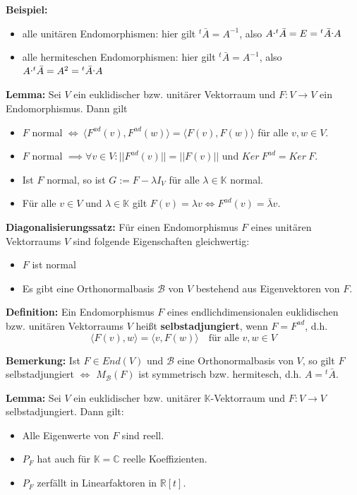 \documentclass{article}
\let\oldcdot\cdot
\renewcommand{\cdot}{\raisebox{0.1ex}{$\oldcdot$}}
\begin{document}
\textbf{Beispiel:}
\begin{itemize}
\item alle unitären Endomorphismen: hier gilt ${^t\bar A=A^{-1}}$, also
	$A\cdot{^t\bar A}= E = {^t\bar A}\cdot A$
\item alle hermiteschen Endomorphismen: hier gilt ${^t\bar A=A^{-1}}$, also
	$A\cdot{^t\bar A}= A^2 = {^t\bar A}\cdot A$
\end{itemize}

\textbf{Lemma:} Sei $V$ ein euklidischer bzw. unitärer Vektorraum und $F:V\to
V$ ein Endomorphismus. Dann gilt
\begin{itemize}
\item[1)] $F$ normal $\iff\ \langle F^{ad}(v),F^{ad}(w)\rangle=\langle
	F(v),F(w)\rangle$ für alle $v,w\in V$.
\item[2)] $F$ normal $\implies\forall v\in V:||F^{ad}(v)||=||F(v)||$ und $Ker\
	F^{ad}=Ker\ F$.
\item[3)] Ist $F$ normal, so ist $G:=F-\lambda I_V$ für alle
	$\lambda\in\mathbb{K}$ normal.
\item[4)] Für alle $v\in V$ und $\lambda\in\mathbb{K}$ gilt $F(v)=\lambda v\iff
	F^{ad}(v)=\bar\lambda v$.
\end{itemize}

\newpage
\textbf{Diagonalisierungssatz:} Für einen Endomorphismus $F$ eines unitären
Vektorraums $V$ sind folgende Eigenschaften gleichwertig:
\begin{itemize}
\item[i)] $F$ ist normal
\item[ii)] Es gibt eine Orthonormalbasis $\mathcal{B}$ von $V$ bestehend aus
	Eigenvektoren von $F$.
\end{itemize}

\textbf{Definition:} Ein Endomorphismus $F$ eines endlichdimensionalen
euklidischen bzw. unitären Vektorraums $V$ heißt \textbf{selbstadjungiert},
wenn $F=F^{ad}$, d.h.
\begin{equation*}
	\langle F(v),w\rangle=\langle v, F(w)\rangle\quad\text{für alle }
	v,w\in V
\end{equation*}

\textbf{Bemerkung:} Ist $F\in End(V)$ und $\mathcal{B}$ eine Orthonormalbasis
von $V$, so gilt $F$ selbstadjungiert $\iff$ $M_\mathcal{B}(F)$ ist symmetrisch
bzw. hermitesch, d.h. $A={^t\bar A}$.

\textbf{Lemma:} Sei $V$ ein euklidischer bzw. unitärer $\mathbb{K}$-Vektorraum
und $F:V\to V$ selbstadjungiert. Dann gilt:
\begin{itemize}
\item[i)] Alle Eigenwerte von $F$ sind reell.
\item[ii)] $P_F$ hat auch für $\mathbb{K=C}$ reelle Koeffizienten.
\item[iii)] $P_F$ zerfällt in Linearfaktoren in $\mathbb{R}[t]$.
\end{itemize}
\end{document}

